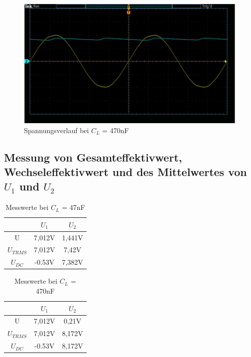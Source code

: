 \documentclass{article}
\begin{document}
\begin{figure}[h]
  \begin{center}
    \includegraphics[scale=0.6]{../assets/images/EL1P2/aufgabe 4 470n.JPG}
    \caption{Spannungsverlauf bei $C_L$ = 470nF}
  \end{center}
\end{figure} 

\newpage

\subsection{Messung von Gesamteffektivwert, Wechseleffektivwert und des Mittelwertes von $U_1$ und $U_2$}

\begin{table}[h]
  \begin{center}
\begin{tabular}{|c|c|c|}
  \hline
  & $U_{1}$ & $U_{2}$  \\
  \hline
  U\raisebox{-0.9ex}{\~{}} & 7,012V & 1,441V\\
  \hline
  $U_{TRMS}$ & 7,012V&7,42V\\
  \hline
  $U_{DC}$ & -0.53V&7,382V\\
  \hline
\end{tabular}
\caption{Messwerte bei $C_L$ = 47nF}
\end{center}
\end{table}

\begin{table}[h]
  \begin{center}
\begin{tabular}{|c|c|c|}
  \hline
  & $U_{1}$ & $U_{2}$  \\
  \hline
  U\raisebox{-0.9ex}{\~{}} & 7,012V & 0,21V\\
  \hline
  $U_{TRMS}$ & 7,012V & 8,172V\\
  \hline
  $U_{DC}$ & -0.53V  & 8,172V\\
  \hline
\end{tabular}
\caption{Messwerte bei $C_L$ = 470nF}
\end{center}
\end{table}
\end{document}
